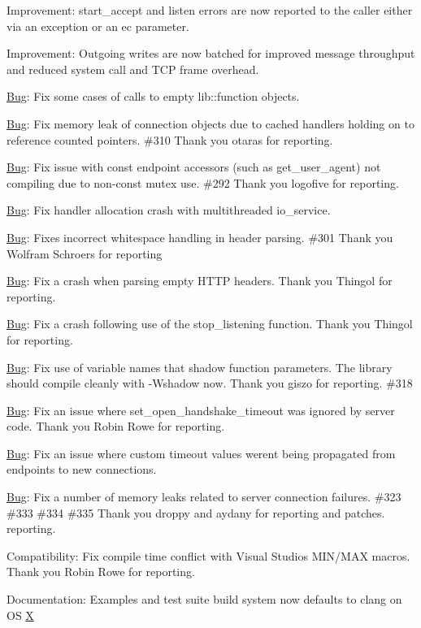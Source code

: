 \begin{DoxyItemize}
\item Improvement\+: {\ttfamily start\+\_\+accept} and {\ttfamily listen} errors are now reported to the caller either via an exception or an ec parameter.
\item Improvement\+: Outgoing writes are now batched for improved message throughput and reduced system call and T\+CP frame overhead.
\item \mbox{\hyperlink{struct_bug}{Bug}}\+: Fix some cases of calls to empty lib\+::function objects.
\item \mbox{\hyperlink{struct_bug}{Bug}}\+: Fix memory leak of connection objects due to cached handlers holding on to reference counted pointers. \#310 Thank you otaras for reporting.
\item \mbox{\hyperlink{struct_bug}{Bug}}\+: Fix issue with const endpoint accessors (such as {\ttfamily get\+\_\+user\+\_\+agent}) not compiling due to non-\/const mutex use. \#292 Thank you logofive for reporting.
\item \mbox{\hyperlink{struct_bug}{Bug}}\+: Fix handler allocation crash with multithreaded {\ttfamily io\+\_\+service}.
\item \mbox{\hyperlink{struct_bug}{Bug}}\+: Fixes incorrect whitespace handling in header parsing. \#301 Thank you Wolfram Schroers for reporting
\item \mbox{\hyperlink{struct_bug}{Bug}}\+: Fix a crash when parsing empty H\+T\+TP headers. Thank you Thingol for reporting.
\item \mbox{\hyperlink{struct_bug}{Bug}}\+: Fix a crash following use of the {\ttfamily stop\+\_\+listening} function. Thank you Thingol for reporting.
\item \mbox{\hyperlink{struct_bug}{Bug}}\+: Fix use of variable names that shadow function parameters. The library should compile cleanly with -\/\+Wshadow now. Thank you giszo for reporting. \#318
\item \mbox{\hyperlink{struct_bug}{Bug}}\+: Fix an issue where {\ttfamily set\+\_\+open\+\_\+handshake\+\_\+timeout} was ignored by server code. Thank you Robin Rowe for reporting.
\item \mbox{\hyperlink{struct_bug}{Bug}}\+: Fix an issue where custom timeout values weren\textquotesingle{}t being propagated from endpoints to new connections.
\item \mbox{\hyperlink{struct_bug}{Bug}}\+: Fix a number of memory leaks related to server connection failures. \#323 \#333 \#334 \#335 Thank you droppy and aydany for reporting and patches. reporting.
\item Compatibility\+: Fix compile time conflict with Visual Studio\textquotesingle{}s M\+I\+N/\+M\+AX macros. Thank you Robin Rowe for reporting.
\item Documentation\+: Examples and test suite build system now defaults to clang on OS \mbox{\hyperlink{class_x}{X}}
\end{DoxyItemize}


